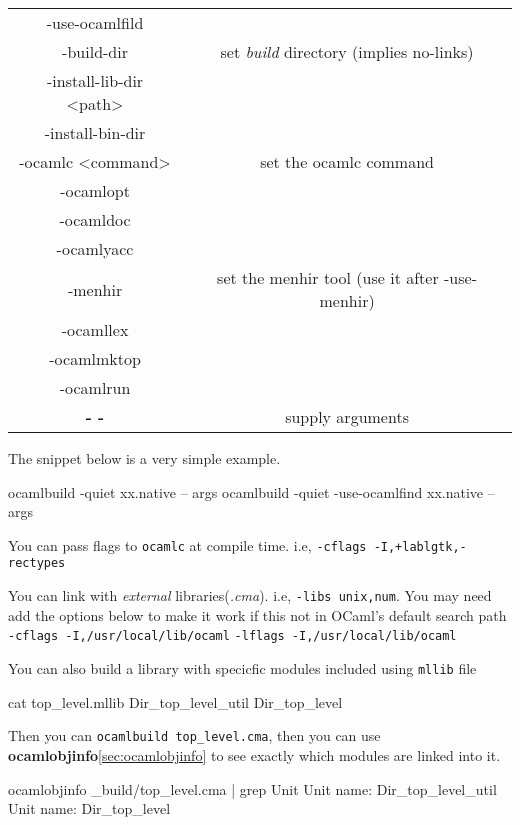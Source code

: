 \begin{longtable}{|c|c|}
-use-ocamlfild & \\
-build-dir & set \textit{build} directory (implies no-links)\\
-install-lib-dir <path> & \\
-install-bin-dir & \\
-ocamlc <command> & set the ocamlc command \\
-ocamlopt  & \\
-ocamldoc & \\
-ocamlyacc & \\
-menhir & set the menhir tool (use it after -use-menhir)\\
-ocamllex & \\
-ocamlmktop & \\
-ocamlrun & \\
\textbf{- -}  & supply arguments \\
\hline
\end{longtable}

The snippet below is a very simple example.

\begin{bashcode}
ocamlbuild -quiet xx.native -- args
ocamlbuild -quiet -use-ocamlfind xx.native -- args
\end{bashcode}

You can pass flags to \verb|ocamlc| at compile time. i.e,
\verb|-cflags -I,+lablgtk,-rectypes|

You can link with \textit{ external} libraries(\textit{.cma}). i.e,
\verb|-libs unix,num|.  You may need add the options below to make it
work if this not in OCaml's default search path
\verb|-cflags -I,/usr/local/lib/ocaml|
\verb|-lflags -I,/usr/local/lib/ocaml|


You can also build a library with specicfic modules included using
\verb|mllib| file

\begin{bashcode}
cat top_level.mllib    
Dir_top_level_util
Dir_top_level  
\end{bashcode}

Then you can \verb|ocamlbuild top_level.cma|, then you can use
\textbf{ocamlobjinfo}\ref{sec:ocamlobjinfo} to see exactly which
modules are linked into it.

\begin{bashcode}
ocamlobjinfo _build/top_level.cma | grep Unit  
Unit name: Dir_top_level_util
Unit name: Dir_top_level
\end{bashcode}

